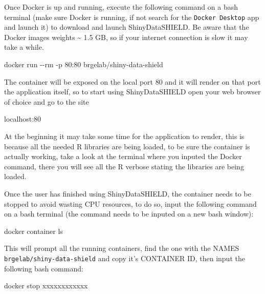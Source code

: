 \documentclass[
]{book}
\newenvironment{Shaded}{\begin{snugshade}}{\end{snugshade}}
\newcommand{\AttributeTok}[1]{\textcolor[rgb]{0.77,0.63,0.00}{#1}}
\newcommand{\ExtensionTok}[1]{#1}
\newcommand{\NormalTok}[1]{#1}
\begin{document}
Once Docker is up and running, execute the following command on a bash terminal (make sure Docker is running, if not search for the \texttt{Docker\ Desktop} app and launch it) to download and launch ShinyDataSHIELD. Be aware that the Docker images weights \textasciitilde{} 1.5 GB, so if your internet connection is slow it may take a while.

\begin{Shaded}
\begin{Highlighting}[]
\ExtensionTok{docker}\NormalTok{ run }\AttributeTok{{-}{-}rm} \AttributeTok{{-}p}\NormalTok{ 80:80 brgelab/shiny{-}data{-}shield}
\end{Highlighting}
\end{Shaded}

The container will be exposed on the local port 80 and it will render on that port the application itself, so to start using ShinyDataSHIELD open your web browser of choice and go to the site

\begin{Shaded}
\begin{Highlighting}[]
\ExtensionTok{localhost:80}
\end{Highlighting}
\end{Shaded}

At the beginning it may take some time for the application to render, this is because all the needed R libraries are being loaded, to be sure the container is actually working, take a look at the terminal where you inputed the Docker command, there you will see all the R verbose stating the libraries are being loaded.

Once the user has finished using ShinyDataSHIELD, the container needs to be stopped to avoid wasting CPU resources, to do so, input the following command on a bash terminal (the command needs to be inputed on a new bash window):

\begin{Shaded}
\begin{Highlighting}[]
\ExtensionTok{docker}\NormalTok{ container ls}
\end{Highlighting}
\end{Shaded}

This will prompt all the running containers, find the one with the NAMES \texttt{brgelab/shiny-data-shield} and copy it's CONTAINER ID, then input the following bash command:

\begin{Shaded}
\begin{Highlighting}[]
\ExtensionTok{docker}\NormalTok{ stop xxxxxxxxxxxx}
\end{Highlighting}
\end{Shaded}
\end{document}
